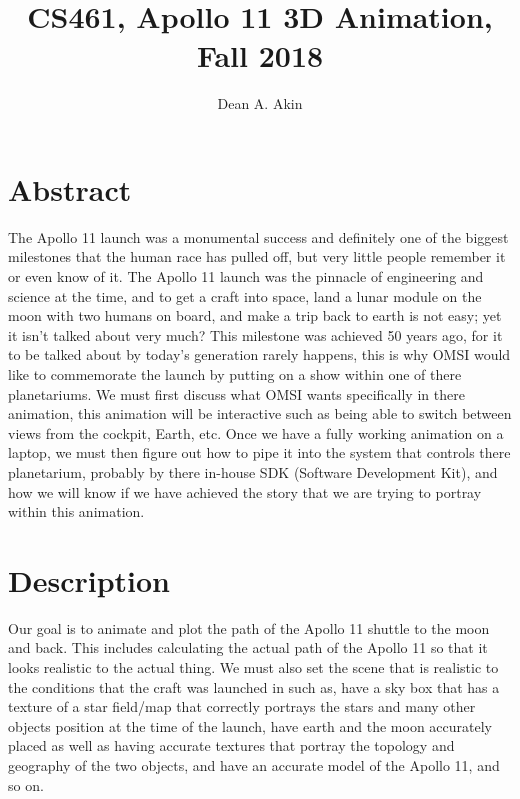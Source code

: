 \documentclass[10pt,a4paper,oneside,onecolumn, english]{IEEEtran}
\author{Dean A. Akin}
\title{CS461, Apollo 11 3D Animation, Fall 2018}
\begin{document}
\maketitle
\section{Abstract}
The Apollo 11 launch was a monumental success and definitely one of the biggest milestones that the human race has pulled off, but very little people remember it or even know of it. The Apollo 11 launch was the pinnacle of engineering and science at the time, and to get a craft into space, land a lunar module on the moon with two humans on board, and make a trip back to earth is not easy; yet it isn't talked about very much? This milestone was achieved 50 years ago, for it to be talked about by today's generation rarely happens, this is why OMSI would like to commemorate the launch by putting on a show within one of there planetariums. We must first discuss what OMSI wants specifically in there animation, this animation will be interactive such as being able to switch between views from the cockpit, Earth, etc. Once we have a fully working animation on a laptop, we must then figure out how to pipe it into the system that controls there planetarium, probably by there in-house SDK (Software Development Kit), and how we will know if we have achieved the story that we are trying to portray within this animation. 

\section{Description}
Our goal is to animate and plot the path of the Apollo 11 shuttle to the moon and back. This includes calculating the actual path of the Apollo 11 so that it looks realistic to the actual thing. We must also set the scene that is realistic to the conditions that the craft was launched in such as, have a sky box that has a texture of a star field/map that correctly portrays the stars and many other objects position at the time of the launch, have earth and the moon accurately placed as well as having accurate textures that portray the topology and geography of the two objects, and have an accurate model of the Apollo 11, and so on. 
\end{document}
